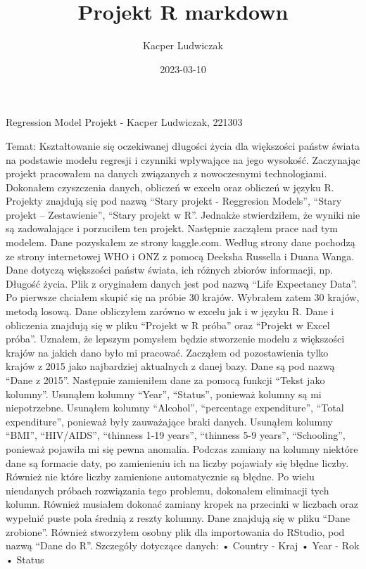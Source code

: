 \documentclass[
]{article}
\title{Projekt R markdown}
\author{Kacper Ludwiczak}
\date{2023-03-10}
\begin{document}
\maketitle

Regression Model Projekt - Kacper Ludwiczak, 221303

Temat: Kształtowanie się oczekiwanej długości życia dla większości
państw świata na podstawie modelu regresji i czynniki wpływające na jego
wysokość. Zaczynając projekt pracowałem na danych związanych z
nowoczesnymi technologiami. Dokonałem czyszczenia danych, obliczeń w
excelu oraz obliczeń w języku R. Projekty znajdują się pod nazwą ``Stary
projekt - Reggresion Models'', ``Stary projekt -- Zestawienie'', ``Stary
projekt w R''. Jednakże stwierdziłem, że wyniki nie są zadowalające i
porzuciłem ten projekt. Następnie zacząłem prace nad tym modelem. Dane
pozyskałem ze strony kaggle.com. Według strony dane pochodzą ze strony
internetowej WHO i ONZ z pomocą Deeksha Russella i Duana Wanga. Dane
dotyczą większości państw świata, ich różnych zbiorów informacji, np.
Długość życia. Plik z oryginałem danych jest pod nazwą ``Life Expectancy
Data''. Po pierwsze chciałem skupić się na próbie 30 krajów. Wybrałem
zatem 30 krajów, metodą losową. Dane obliczyłem zarówno w excelu jak i w
języku R. Dane i obliczenia znajdują się w pliku ``Projekt w R próba''
oraz ``Projekt w Excel próba''. Uznałem, że lepszym pomysłem będzie
stworzenie modelu z większości krajów na jakich dano było mi pracować.
Zacząłem od pozostawienia tylko krajów z 2015 jako najbardziej
aktualnych z danej bazy. Dane są pod nazwą ``Dane z 2015''. Następnie
zamieniłem dane za pomocą funkcji ``Tekst jako kolumny''. Usunąłem
kolumny ``Year'', ``Status'', ponieważ kolumny są mi niepotrzebne.
Usunąłem kolumny ``Alcohol'', ``percentage expenditure'', ``Total
expenditure'', ponieważ były zauważające braki danych. Usunąłem kolumny
``BMI'', ``HIV/AIDS'', ``thinness 1-19 years'', ``thinness 5-9 years'',
``Schooling'', ponieważ pojawiła mi się pewna anomalia. Podczas zamiany
na kolumny niektóre dane są formacie daty, po zamienieniu ich na liczby
pojawiały się błędne liczby. Również nie które liczby zamienione
automatycznie są błędne. Po wielu nieudanych próbach rozwiązania tego
problemu, dokonałem eliminacji tych kolumn. Również musiałem dokonać
zamiany kropek na przecinki w liczbach oraz wypełnić puste pola średnią
z reszty kolumny. Dane znajdują się w pliku ``Dane zrobione''. Również
stworzyłem osobny plik dla importowania do RStudio, pod nazwą ``Dane do
R''. Szczegóły dotyczące danych: • Country - Kraj • Year - Rok • Status
\end{document}
